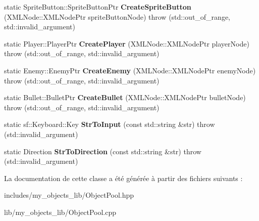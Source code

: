 \begin{DoxyCompactItemize}
static Sprite\+Button\+::\+Sprite\+Button\+Ptr {\bfseries Create\+Sprite\+Button} (X\+M\+L\+Node\+::\+X\+M\+L\+Node\+Ptr sprite\+Button\+Node)  throw (std\+::out\+\_\+of\+\_\+range, std\+::invalid\+\_\+argument)
\item 
\mbox{\label{classmy_1_1ObjectPool_a8ec76923583ccd1dc344982344fc1eca}} 
static Player\+::\+Player\+Ptr {\bfseries Create\+Player} (X\+M\+L\+Node\+::\+X\+M\+L\+Node\+Ptr player\+Node)  throw (std\+::out\+\_\+of\+\_\+range, std\+::invalid\+\_\+argument)
\item 
\mbox{\label{classmy_1_1ObjectPool_a62c813dde06c27493091bd853f6f6cd8}} 
static Enemy\+::\+Enemy\+Ptr {\bfseries Create\+Enemy} (X\+M\+L\+Node\+::\+X\+M\+L\+Node\+Ptr enemy\+Node)  throw (std\+::out\+\_\+of\+\_\+range, std\+::invalid\+\_\+argument)
\item 
\mbox{\label{classmy_1_1ObjectPool_a24c54c3d8012d2faea51b360cd5f4a46}} 
static Bullet\+::\+Bullet\+Ptr {\bfseries Create\+Bullet} (X\+M\+L\+Node\+::\+X\+M\+L\+Node\+Ptr bullet\+Node)  throw (std\+::out\+\_\+of\+\_\+range, std\+::invalid\+\_\+argument)
\item 
\mbox{\label{classmy_1_1ObjectPool_a75da7062dfe02748a2193cf7236e63a3}} 
static sf\+::\+Keyboard\+::\+Key {\bfseries Str\+To\+Input} (const std\+::string \&str)  throw (std\+::invalid\+\_\+argument)
\item 
\mbox{\label{classmy_1_1ObjectPool_ad5f86669f0e3e8b93a897ff3d1723cd4}} 
static Direction {\bfseries Str\+To\+Direction} (const std\+::string \&str)  throw (std\+::invalid\+\_\+argument)
\end{DoxyCompactItemize}


La documentation de cette classe a été générée à partir des fichiers suivants \+:\begin{DoxyCompactItemize}
\item 
includes/my\+\_\+objects\+\_\+lib/Object\+Pool.\+hpp\item 
lib/my\+\_\+objects\+\_\+lib/Object\+Pool.\+cpp\end{DoxyCompactItemize}

